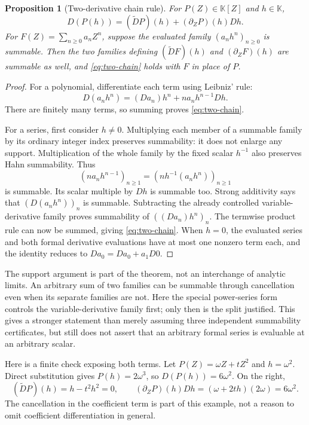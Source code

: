 \documentclass[11pt,a4paper]{article}
\numberwithin{equation}{section}
\newtheorem{proposition}[theorem]{Proposition}
\theoremstyle{definition}
\theoremstyle{remark}
\newcommand{\K}{\mathbb K}
\newcommand{\DD}{\widetilde D}
\begin{document}
\begin{proposition}[Two-derivative chain rule]\label{prop:chain}
For $P(Z)\in\K[Z]$ and $h\in\K$,
\begin{equation}\label{eq:two-chain}
 D(P(h))=(\DD P)(h)+(\partial_ZP)(h)Dh.
\end{equation}
For $F(Z)=\sum_{n\geq0}a_nZ^n$, suppose the evaluated family
$(a_nh^n)_{n\geq0}$ is summable. Then the two families defining
$(\DD F)(h)$ and $(\partial_ZF)(h)$ are summable as well, and
\eqref{eq:two-chain} holds with $F$ in place of $P$.
\end{proposition}
\begin{proof}
For a polynomial, differentiate each term using Leibniz' rule:
\[
 D(a_nh^n)=(Da_n)h^n+n a_nh^{n-1}Dh.
\]
There are finitely many terms, so summing proves \eqref{eq:two-chain}.

For a series, first consider $h\ne0$. Multiplying each member of a
summable family by its ordinary integer index preserves summability:
it does not enlarge any support. Multiplication of the whole family by
the fixed scalar $h^{-1}$ also preserves Hahn summability. Thus
\[
 (n a_nh^{n-1})_{n\geq1}
 =(n h^{-1}(a_nh^n))_{n\geq1}
\]
is summable. Its scalar multiple by $Dh$ is summable too. Strong
additivity says that $(D(a_nh^n))_n$ is summable. Subtracting the
already controlled variable-derivative family proves summability of
$((Da_n)h^n)_n$. The termwise product rule can now be summed, giving
\eqref{eq:two-chain}. When $h=0$, the evaluated series and both formal
derivative evaluations have at most one nonzero term each, and the
identity reduces to $Da_0=Da_0+a_1D0$.
\end{proof}

The support argument is part of the theorem, not an interchange of
analytic limits. An arbitrary sum of two families can be summable through
cancellation even when its separate families are not. Here the special
power-series form controls the variable-derivative family first; only
then is the split justified. This gives a stronger statement than merely
assuming three independent summability certificates, but still does not
assert that an arbitrary formal series is evaluable at an arbitrary scalar.

Here is a finite check exposing both terms. Let
$P(Z)=\omega Z+tZ^2$ and $h=\omega^2$. Direct substitution gives
$P(h)=2\omega^3$, so $D(P(h))=6\omega^2$. On the right,
\[
 (\DD P)(h)=h-t^2h^2=0,
 \qquad
 (\partial_ZP)(h)Dh=(\omega+2th)(2\omega)=6\omega^2.
\]
The cancellation in the coefficient term is part of this example, not a
reason to omit coefficient differentiation in general.
\end{document}
